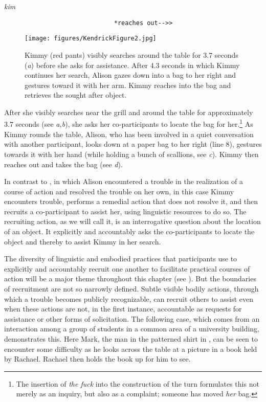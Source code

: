 \documentclass[output=paper,nonflat,modfont,draft]{langsci/langscibook}
\begin{document}
\begin{transbox}{12}{\textit{kim}}
\begin{verbatim}
                              *reaches out-->>
\end{verbatim}
\end{transbox}
\clearpage

\begin{figure}
  \caption{Kimmy (red pants) visibly searches around the table for 3.7 seconds (\textit{a}) before she asks for assistance. After 4.3 seconds in which Kimmy continues her search, Alison gazes down into a bag to her right and gestures toward it with her arm. Kimmy reaches into the bag and retrieves the sought after object.   }
  \texttt{[image: figures/KendrickFigure2.jpg]}
  \label{fig:kendrick:2}
\end{figure}

After she visibly searches near the grill and around the table for approximately 3.7 seconds (see \textit{a,b}), she asks her co-participants to locate the bag for her.\footnote{The insertion of \textit{the fuck} into the construction of the turn formulates this not merely as an inquiry, but also as a complaint; someone has moved \textit{her} bag.} As Kimmy rounds the table, Alison, who has been involved in a quiet conversation with another participant, looks down at a paper bag to her right (line 8), gestures towards it with her hand (while holding a bunch of scallions, see \textit{c}). Kimmy then reaches out and takes the bag (see \textit{d}).

In contrast to , in which Alison encountered a trouble in the realization of a course of action and resolved the trouble on her own, in this case Kimmy encounters trouble, performs a remedial action that does not resolve it, and then recruits a co-participant to assist her, using linguistic resources to do so. The recruiting action, as we will call it, is an interrogative question about the location of an object. It explicitly and accountably asks the co-participants to locate the object and thereby to assist Kimmy in her search.

The diversity of linguistic and embodied practices that participants use to explicitly and accountably recruit one another to facilitate practical courses of action will be a major theme throughout this chapter (see ). But the boundaries of recruitment are not so narrowly defined. Subtle visible bodily actions, through which a trouble becomes publicly recognizable, can recruit others to assist even when these actions are not, in the first instance, accountable as requests for assistance or other forms of solicitation. The following case, which comes from an interaction among a group of students in a common area of a university building, demonstrates this. Here Mark, the man in the patterned shirt in , can be seen to encounter some difficulty as he looks across the table at a picture in a book held by Rachael. Rachael then holds the book up for him to see.
\end{document}
